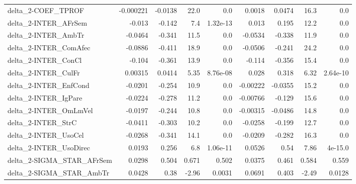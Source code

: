 \begin{tabular}{lrrrrrrrr}
delta\_2-COEF\_TPROF                     &   -0.000221 &      -0.0138 &     22.0 &      0.0 &     0.0018 &      0.0474 &         16.3 &           0.0 \\
delta\_2-INTER\_AFrSem                   &      -0.013 &       -0.142 &      7.4 & 1.32e-13 &      0.013 &       0.195 &         12.2 &           0.0 \\
delta\_2-INTER\_AmbTr                    &     -0.0464 &       -0.341 &     11.5 &      0.0 &    -0.0534 &      -0.338 &         11.9 &           0.0 \\
delta\_2-INTER\_ComAfec                  &     -0.0886 &       -0.411 &     18.9 &      0.0 &    -0.0506 &      -0.241 &         24.2 &           0.0 \\
delta\_2-INTER\_ConCl                    &      -0.104 &       -0.361 &     13.9 &      0.0 &     -0.114 &      -0.356 &         15.4 &           0.0 \\
delta\_2-INTER\_CulFr                    &     0.00315 &       0.0414 &     5.35 & 8.76e-08 &      0.028 &       0.318 &         6.32 &      2.64e-10 \\
delta\_2-INTER\_EnfCond                  &     -0.0201 &       -0.254 &     10.9 &      0.0 &   -0.00222 &     -0.0355 &         15.2 &           0.0 \\
delta\_2-INTER\_IgPare                   &     -0.0224 &       -0.278 &     11.2 &      0.0 &   -0.00766 &      -0.129 &         15.6 &           0.0 \\
delta\_2-INTER\_OmLmVel                  &     -0.0197 &       -0.244 &     10.8 &      0.0 &   -0.00315 &     -0.0486 &         14.8 &           0.0 \\
delta\_2-INTER\_StrC                     &     -0.0411 &       -0.303 &     10.2 &      0.0 &    -0.0258 &      -0.199 &         12.7 &           0.0 \\
delta\_2-INTER\_UsoCel                   &     -0.0268 &       -0.341 &     14.1 &      0.0 &    -0.0209 &      -0.282 &         16.3 &           0.0 \\
delta\_2-INTER\_UsoDirec                 &      0.0193 &        0.256 &      6.8 & 1.06e-11 &     0.0526 &        0.54 &         7.86 &       4e-15.0 \\
delta\_2-SIGMA\_STAR\_AFrSem              &      0.0298 &        0.504 &    0.671 &    0.502 &     0.0375 &       0.461 &        0.584 &         0.559 \\
delta\_2-SIGMA\_STAR\_AmbTr               &      0.0428 &         0.38 &    -2.96 &   0.0031 &     0.0691 &       0.403 &        -2.49 &        0.0128 \\

\end{tabular}
